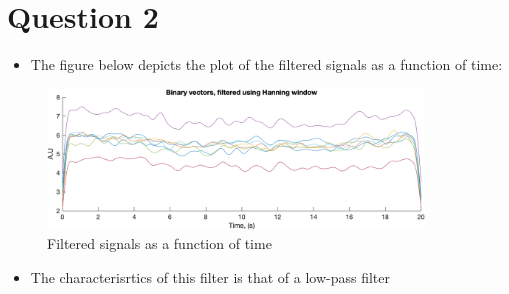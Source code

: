 \documentclass[a4paper, 12pt]{article}
\begin{document}
\newpage
\section*{Question 2}
  \begin{itemize}
    \item The figure below depicts the plot of the filtered signals as a function of time:
  \end{itemize}
  \begin{figure}[H]
    \centering
    \includegraphics[width= 10cm]{filtered.png}
    \caption{Filtered signals as a function of time}
  \end{figure}
  \begin{itemize}
    \item The characterisrtics of this filter is that of a low-pass filter
  \end{itemize}
\newpage
{}
%    
\end{document}
